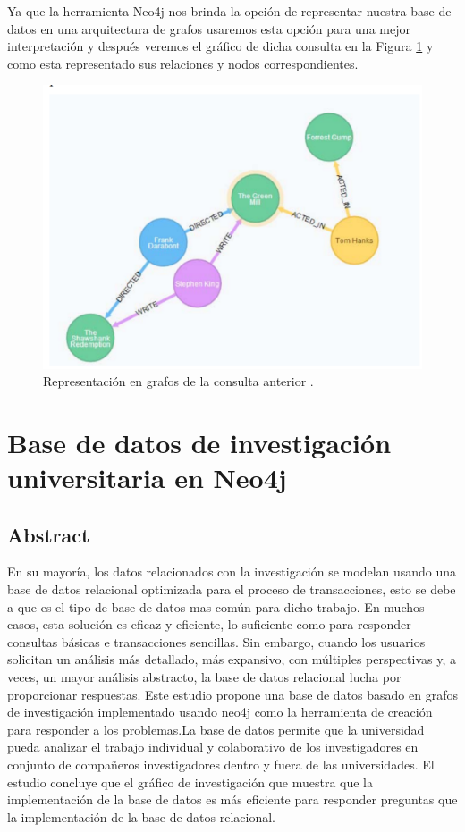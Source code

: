 Ya que la herramienta Neo4j nos brinda la opción de representar nuestra base de datos en una arquitectura de grafos usaremos esta opción para una mejor interpretación y después veremos el gráfico de dicha consulta en la Figura \ref{fig:rep} y como esta representado sus relaciones y nodos correspondientes.
\begin{figure}[H]
    \centering
    \includegraphics[scale=0.5]{Graficos/consultagraph.png}
    \caption{Representación en grafos de la consulta anterior \cite{lu2017analysis}.}
    \label{fig:rep}
\end{figure}
\section{Base de datos de investigación universitaria en Neo4j}
\subsection{Abstract}
En su mayoría, los datos relacionados con la investigación se modelan
usando una base de datos relacional optimizada para el proceso de transacciones, esto se debe a que es el tipo de base de datos mas común para dicho trabajo. En muchos casos, esta solución es eficaz y eficiente, lo suficiente como para responder consultas básicas e transacciones sencillas. Sin embargo, cuando los usuarios solicitan un análisis más detallado, más expansivo, con múltiples perspectivas y, a veces, un mayor análisis abstracto, la base de datos relacional lucha por proporcionar respuestas. Este estudio propone una base de datos basado en grafos de investigación implementado usando neo4j como la herramienta de creación para responder a los problemas.La base de datos permite que la
universidad pueda analizar el trabajo individual y colaborativo de los investigadores en conjunto de compañeros investigadores dentro y fuera de las
universidades. El estudio concluye que el gráfico de investigación que muestra que la implementación de la base de datos es más eficiente para responder
preguntas que la implementación de la base de datos relacional.
